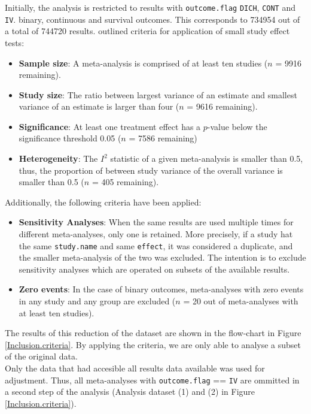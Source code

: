\documentclass[11pt,a4paper,twoside]{book}\usepackage[]{graphicx}\usepackage[]{color}
\begin{document}
Initially, the analysis is restricted to results with \texttt{outcome.flag} \texttt{DICH}, \texttt{CONT} and \texttt{IV}. binary, continuous and survival outcomes. This corresponds to 734954 out of a total of 744720 results.
\citet{Ioannidis2007} outlined criteria for application of small study effect tests:
\begin{itemize}
\item \textbf{Sample size}: A meta-analysis is comprised of at least ten studies ($n$ = 9916 remaining). 
\item \textbf{Study size}: The ratio between largest variance of an estimate and smallest variance of an estimate is larger than four ($n$ = 9616 remaining).
\item \textbf{Significance}: At least one treatment effect has a $p$-value below the significance threshold 0.05 ($n$ = 7586 remaining)
\item \textbf{Heterogeneity}: The $I^2$ statistic of a given meta-analysis is smaller than 0.5, thus, the proportion of between study variance of the overall variance is smaller than 0.5 ($n$ = 405 remaining).
\end{itemize}
Additionally, the following criteria have been applied:
\begin{itemize}
\item \textbf{Sensitivity Analyses}: When the same results are used multiple times for different meta-analyses, only one is retained. More precisely, if a study hat the same \texttt{study.name} and same \texttt{effect}, it was considered a duplicate, and the smaller meta-analysis of the two was excluded. The intention is to exclude sensitivity analyses which are operated on subsets of the available results.
\item \textbf{Zero events}: In the case of binary outcomes, meta-analyses with zero events in any study and any group are excluded ($n$ = 20 out of meta-analyses with at least ten studies).
\end{itemize}

The results of this reduction of the dataset are shown in the flow-chart in Figure \ref{Inclusion.criteria}. By applying the criteria, we are only able to analyse a subset of the original data. \\
Only the data that had accesible all results data available was used for adjustment. Thus, all meta-analyses with \texttt{outcome.flag} == \texttt{IV} are ommitted in a second step of the analysis (Analysis dataset (1) and (2) in Figure \ref{Inclusion.criteria}).
\end{document}
